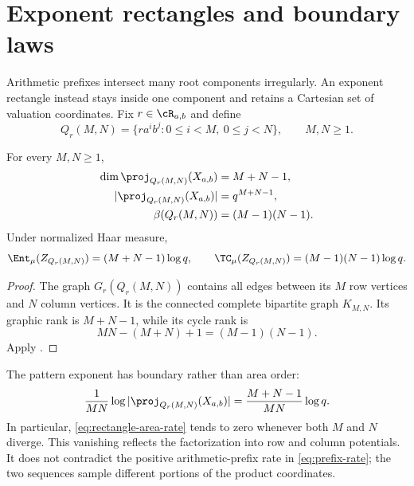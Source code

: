 \section{Exponent rectangles and boundary laws}\label{sec:rectangles}

Arithmetic prefixes intersect many root components irregularly.  An exponent
rectangle instead stays inside one component and retains a Cartesian set of
valuation coordinates.  Fix $r\in\cR_{a,b}$ and define
\begin{equation}\label{eq:rectangle}
 Q_r(M,N)=\{r a^i b^j:0\leq i<M,\ 0\leq j<N\},
 \qquad M,N\geq1.
\end{equation}

\begin{proposition}\label{prop:rectangle}
For every $M,N\geq1$,
\begin{align}
 \dim\proj_{Q_r(M,N)}(X_{a,b})&=M+N-1,
 \label{eq:rectangle-dimension}\\
 |\proj_{Q_r(M,N)}(X_{a,b})|&=q^{M+N-1},
 \label{eq:rectangle-count}\\
 \beta(Q_r(M,N))&=(M-1)(N-1).
 \label{eq:rectangle-beta}
\end{align}
Under normalized Haar measure,
\begin{equation}\label{eq:rectangle-haar}
 \Ent_\mu(Z_{Q_r(M,N)})=(M+N-1)\log q,
 \qquad
 \TC_\mu(Z_{Q_r(M,N)})=(M-1)(N-1)\log q.
\end{equation}
\end{proposition}

\begin{proof}
The graph $G_r(Q_r(M,N))$ contains all edges between its $M$ row vertices and
$N$ column vertices.  It is the connected complete bipartite graph
$K_{M,N}$.  Its graphic rank is $M+N-1$, while its cycle rank is
\[
 MN-(M+N)+1=(M-1)(N-1).
\]
Apply .
\end{proof}

The pattern exponent has boundary rather than area order:
\begin{equation}\label{eq:rectangle-area-rate}
 \frac{1}{MN}\log|\proj_{Q_r(M,N)}(X_{a,b})|
 =\frac{M+N-1}{MN}\log q.
\end{equation}
In particular, \eqref{eq:rectangle-area-rate} tends to zero whenever both
$M$ and $N$ diverge.  This vanishing reflects the factorization into row and
column potentials.  It does not contradict the positive arithmetic-prefix
rate in \eqref{eq:prefix-rate}; the two sequences sample different portions
of the product coordinates.


